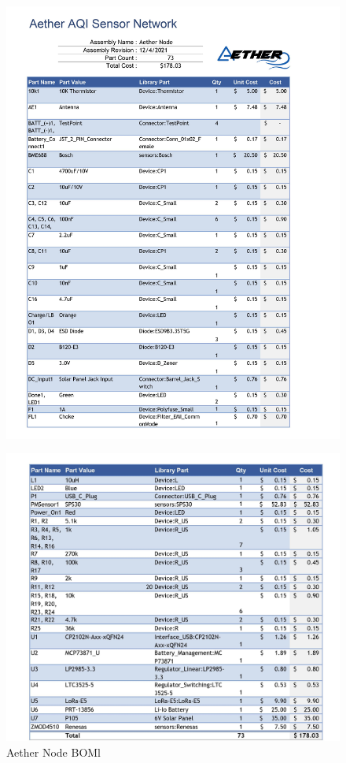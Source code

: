 \begin{figure}
    \centering
    \includegraphics[width=6in]{figures/BOM_1.jpg}
    \label{fig:BOM_1} 
\end{figure}
\begin{figure}
    \centering
    \includegraphics[width=6in]{figures/BOM_2.jpg}
    \caption{Aether Node BOMl}
    \label{fig:BOM_2} 
\end{figure}